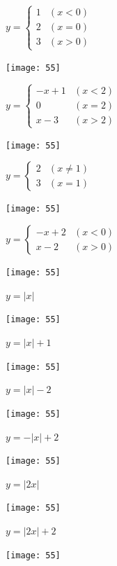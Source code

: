\documentclass[a4paper]{oblivoir}
\begin{document}
\clearpage
\begin{minipage}{0.45\textwidth}\centering
\(y=\begin{cases}1&(x<0)\\2&(x=0)\\3&(x>0)\end{cases}\)
\par\bigskip\texttt{[image: 55]}
\end{minipage}
\begin{minipage}{0.45\textwidth}\centering
\(y=\begin{cases}-x+1&(x<2)\\0&(x=2)\\x-3&(x>2)\end{cases}\)
\par\bigskip\texttt{[image: 55]}
\end{minipage}\bigskip\bigskip\par
\begin{minipage}{0.45\textwidth}\centering
\(y=\begin{cases}2&(x\neq1)\\3&(x=1)\end{cases}\)
\par\bigskip\texttt{[image: 55]}
\end{minipage}
\begin{minipage}{0.45\textwidth}\centering
\(y=\begin{cases}-x+2&(x<0)\\x-2&(x>0)\end{cases}\)
\par\bigskip\texttt{[image: 55]}
\end{minipage}\bigskip\bigskip\par

\clearpage
\begin{minipage}{0.45\textwidth}\centering
\(y=|x|\)
\par\bigskip\texttt{[image: 55]}
\end{minipage}
\begin{minipage}{0.45\textwidth}\centering
\(y=|x|+1\)
\par\bigskip\texttt{[image: 55]}
\end{minipage}\bigskip\bigskip\par
\begin{minipage}{0.45\textwidth}\centering
\(y=|x|-2\)
\par\bigskip\texttt{[image: 55]}
\end{minipage}
\begin{minipage}{0.45\textwidth}\centering
\(y=-|x|+2\)
\par\bigskip\texttt{[image: 55]}
\end{minipage}\bigskip\bigskip\par
\begin{minipage}{0.45\textwidth}\centering
\(y=|2x|\)
\par\bigskip\texttt{[image: 55]}
\end{minipage}
\begin{minipage}{0.45\textwidth}\centering
\(y=|2x|+2\)
\par\bigskip\texttt{[image: 55]}
\end{minipage}\bigskip\bigskip\par
\end{document}
